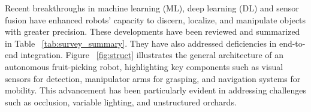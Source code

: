 \documentclass[pdflatex,sn-mathphys-num]{sn-jnl}
\begin{document}
Recent breakthroughs in machine learning (ML), deep learning (DL) and sensor fusion have enhanced robots' capacity to discern, localize, and manipulate objects with greater precision. These developments have been reviewed and summarized in Table ~\ref{tab:survey_summary}. They have also addressed deficiencies in end-to-end integration.
 Figure ~\ref{fig:struct} illustrates the general architecture of an autonomous fruit-picking robot, highlighting key components such as visual sensors for detection, manipulator arms for grasping, and navigation systems for mobility. This advancement has been particularly evident in addressing challenges such as occlusion, variable lighting, and unstructured orchards.
\end{document}
